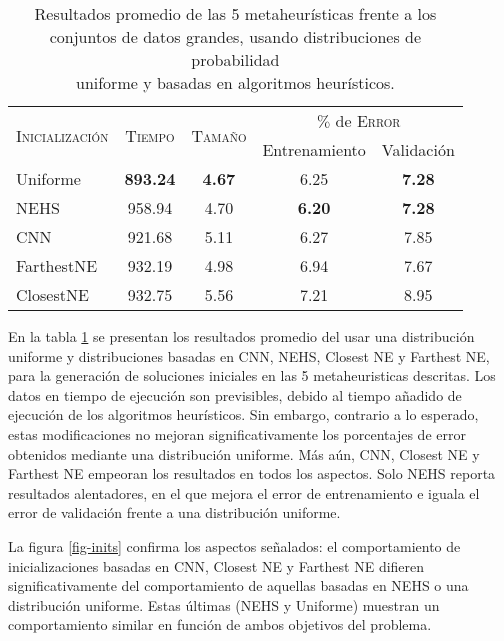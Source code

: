 \begin{table}[h!]
\centering
\begin{tabular}{l c c c c}
\hline
\multirow{2}{*}{\textsc{Inicialización}}
	& \multirow{2}{*}{\textsc{Tiempo}}
	& \multirow{2}{*}{\textsc{Tamaño}}
	& \multicolumn{2}{c}{$\%$ de \textsc{Error}} \\\cline{4-5}
 & & & \scriptsize{Entrenamiento} & \scriptsize{Validación} \\
\hline
\hline
Uniforme   & \textbf{893.24} & \textbf{4.67} & 6.25 & \textbf{7.28} \\
NEHS       & 958.94 & 4.70 & \textbf{6.20} & \textbf{7.28} \\
CNN        & 921.68 & 5.11 & 6.27 & 7.85 \\
FarthestNE & 932.19 & 4.98 & 6.94 & 7.67 \\
ClosestNE  & 932.75 & 5.56 & 7.21 & 8.95 \\
\hline
\end{tabular}
\caption[Resultados usando distribuciones uniforme y heurísticas]{Resultados promedio de las 5 metaheurísticas frente a los\\conjuntos de datos grandes, usando distribuciones de probabilidad\\uniforme y basadas en algoritmos heurísticos.}
\label{table-inits}
\end{table}

En la tabla \ref{table-inits} se presentan los resultados promedio del usar una distribución uniforme y distribuciones basadas en CNN, NEHS, Closest NE y Farthest NE, para la generación de soluciones iniciales en las 5 metaheuristicas descritas. Los datos en tiempo de ejecución son previsibles, debido al tiempo añadido de ejecución de los algoritmos heurísticos. Sin embargo, contrario a lo esperado, estas modificaciones no mejoran significativamente los porcentajes de error obtenidos mediante una distribución uniforme. Más aún, CNN, Closest NE y Farthest NE empeoran los resultados en todos los aspectos. Solo NEHS reporta resultados alentadores, en el que mejora el error de entrenamiento e iguala el error de validación frente a una distribución uniforme.

La figura \ref{fig-inits} confirma los aspectos señalados: el comportamiento de inicializaciones basadas en CNN, Closest NE y Farthest NE difieren significativamente del comportamiento de aquellas basadas en NEHS o una distribución uniforme. Estas últimas (NEHS y Uniforme) muestran un comportamiento similar en función de ambos objetivos del problema.%

